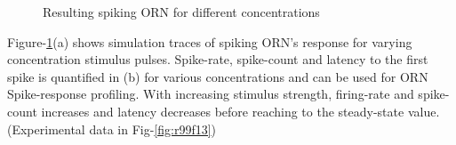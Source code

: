 \documentclass[
]{article}
\begin{document}
\begin{figure}

{\centering {}

}

\caption{Resulting spiking ORN for different concentrations}\label{fig:rCon}
\end{figure}

Figure-\ref{fig:rCon}(a) shows simulation traces of spiking ORN's response for varying concentration stimulus pulses. Spike-rate, spike-count and latency to the first spike is quantified in (b) for various concentrations and can be used for ORN Spike-response profiling. With increasing stimulus strength, firing-rate and spike-count increases and latency decreases before reaching to the steady-state value. (Experimental data in Fig-\ref{fig:r99f13})
\end{document}
